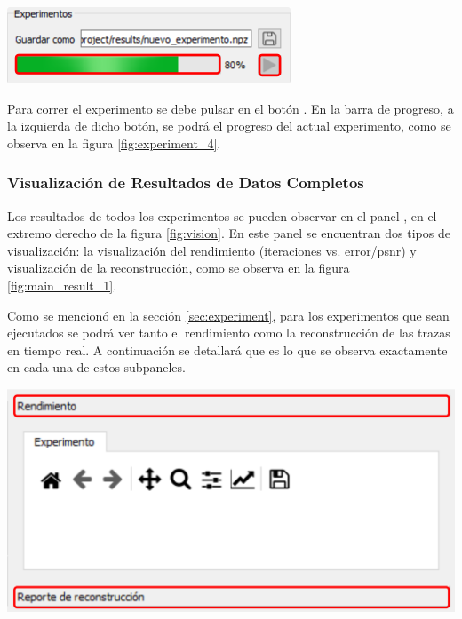 \documentclass[12pt,twoside,letter]{ol-softwaremanual}
\newcommand*\circled[1]{\tikz[baseline=(char.base)]{
            \node[shape=circle,draw,inner sep=2pt] (char) {#1};}}
\newenvironment{Figure}
  {\par\medskip\noindent\minipage{\linewidth}}
  {\endminipage\par\medskip}
\begin{document}
\begin{multicols}{2}

\begin{Figure}
	\centering
	\includegraphics[width=0.7\linewidth]{experiment-4.png}
	\label{fig:experiment_4}
\end{Figure}

Para correr el experimento se debe pulsar en el botón \hspace{0.5mm} \faPlay \hspace{0.5mm}. En la barra de progreso, a la izquierda de dicho botón, se podrá el progreso del actual experimento, como se observa en la figura \ref{fig:experiment_4}.

\end{multicols}

\subsubsection{Visualización de Resultados de Datos Completos}

Los resultados de todos los experimentos se pueden observar en el panel \circled{7}, en el extremo derecho de la figura \ref{fig:vision}. En este panel se encuentran dos tipos de visualización: la visualización del rendimiento (iteraciones vs. error/psnr) y visualización de la reconstrucción, como se observa en la figura \ref{fig:main_result_1}.

\begin{multicols}{2}

Como se mencionó en la sección \ref{sec:experiment}, para los experimentos que sean ejecutados se podrá ver tanto el rendimiento como la reconstrucción de las trazas en tiempo real. A continuación se detallará que es lo que se observa exactamente en cada una de estos subpaneles.

\begin{Figure}
    \centering
    \includegraphics[width=0.7\linewidth]{main-result-1.png}
    \label{fig:main_result_1}
\end{Figure}

\end{multicols}
\end{document}
